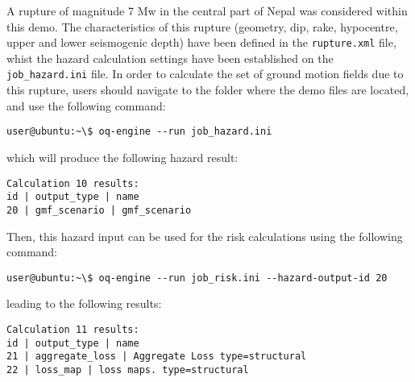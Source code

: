 A rupture of magnitude 7 Mw in the central part of Nepal was considered within
this demo. The characteristics of this rupture (geometry, dip, rake,
hypocentre,  upper and lower seismogenic depth) have been defined in the
\verb+rupture.xml+ file, whist the hazard calculation settings have been
established on the \verb+job_hazard.ini+ file. In order to calculate the set of
ground motion fields due to this rupture, users should navigate to the folder
where the demo files are located, and use the following command:

\begin{Verbatim}[frame=single, commandchars=\\\{\}, samepage=true]
user@ubuntu:~\$ oq-engine --run job_hazard.ini
\end{Verbatim}

which will produce the following hazard result:

\begin{Verbatim}[frame=single, commandchars=\\\{\}, samepage=true]
Calculation 10 results:
id | output_type | name
20 | gmf_scenario | gmf_scenario
\end{Verbatim}

Then, this hazard input can be used for the risk calculations using the
following command:

\begin{Verbatim}[frame=single, commandchars=\\\{\}, samepage=true]
user@ubuntu:~\$ oq-engine --run job_risk.ini --hazard-output-id 20
\end{Verbatim}

leading to the following results:

\begin{Verbatim}[frame=single, commandchars=\\\{\}, samepage=true]
Calculation 11 results:
id | output_type | name
21 | aggregate_loss | Aggregate Loss type=structural
22 | loss_map | loss maps. type=structural
\end{Verbatim}